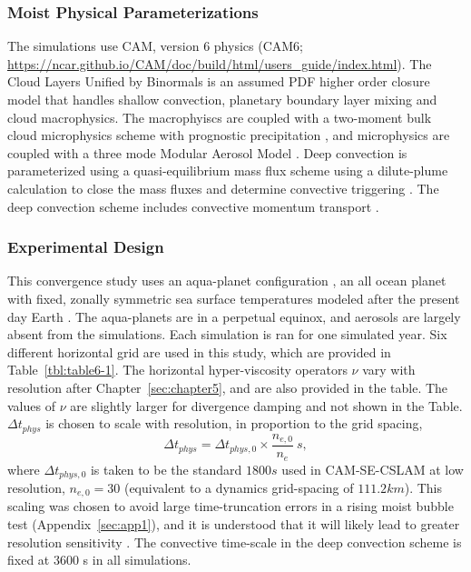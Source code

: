 \subsubsection{Moist Physical Parameterizations}

The simulations use CAM, version 6 physics (CAM6; \url{https://ncar.github.io/CAM/doc/build/html/users_guide/index.html}). The Cloud Layers Unified by Binormals \citep[CLUBB][]{GETAL2002JAS,BOG2013JCLIM} is an assumed PDF higher order closure model that handles shallow convection, planetary boundary layer mixing and cloud macrophysics. The macrophyiscs are coupled with a two-moment bulk cloud microphysics scheme with prognostic precipitation \citep{MG2}, and microphysics are coupled with a three mode Modular Aerosol Model \citep{MAM}. Deep convection is parameterized using a quasi-equilibrium mass flux scheme \citep{ZM1995AO} using a dilute-plume calculation to close the mass fluxes and determine convective triggering \citep{NRJ2008JC}. The deep convection scheme includes convective momentum transport \citep{RR2008JC}.

\subsubsection{Experimental Design}
 
This convergence study uses an aqua-planet configuration \citep{NH2000ASL,MWO2016JAMES}, an all ocean planet with fixed, zonally symmetric sea surface temperatures modeled after the present day Earth \citep[$QOBS$ in][]{NH2000ASL}. The aqua-planets are in a perpetual equinox, and aerosols are largely absent from the simulations. Each simulation is ran for one simulated year. Six different horizontal grid are used in this study, which are provided in Table~\ref{tbl:table6-1}. The horizontal hyper-viscosity operators $\nu$ vary with resolution after Chapter~\ref{sec:chapter5}, and are also provided in the table. The values of $\nu$ are slightly larger for divergence damping and not shown in the Table. $\Delta t_{phys}$ is chosen to scale with resolution, in proportion to the grid spacing,
\begin{equation}
\Delta t_{phys} = \Delta t_{phys,0} \times \frac{n_{e,0}}{n_e}~s,\label{eq:dt-scale}
\end{equation}
where $\Delta t_{phys,0}$ is taken to be the standard $1800 s$ used in CAM-SE-CSLAM at low resolution, $n_{e,0} = 30$ (equivalent to a dynamics grid-spacing of $111.2km$). This scaling was chosen to avoid large time-truncation errors in a rising moist bubble test (Appendix~\ref{sec:app1}), and it is understood that it will likely lead to greater resolution sensitivity \citep{W2008TELLUS}. The convective time-scale in the deep convection scheme is fixed at 3600 s in all simulations.
 
